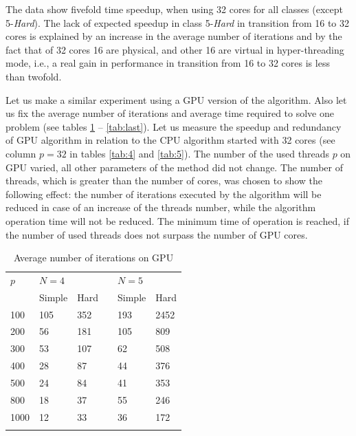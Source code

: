 \documentclass[smallcondensed]{svjour3}     %
\begin{document}
The data show fivefold time speedup, when using 32 cores for all classes (except 5-\textit{Hard}). The lack of expected speedup in class 5-\textit{Hard} in transition from 16 to 32 cores is explained by an increase in the average number of iterations and by the fact that of 32 cores 16 are physical, and other 16 are virtual in hyper-threading mode, i.e., a real gain in performance in transition from 16 to 32 cores is less than twofold.

Let us make a similar experiment using a GPU version of the algorithm. Also let us fix the average number of iterations and average time required to solve one problem (see tables \ref{tab:last4} -- \ref{tab:last}). Let us measure the speedup and redundancy of GPU algorithm in relation to the CPU algorithm started with 32 cores (see column $p=32$ in tables \ref{tab:4} and \ref{tab:5}). The number of the used threads $p$ on GPU varied, all other parameters of the method did not change. The number of threads, which is greater than the number of cores, was chosen to show the following effect: the number of iterations executed by the algorithm will be reduced in case of an increase of the threads number, while the algorithm operation time will not be reduced. The minimum time of operation is reached, if the number of used threads does not surpass the number of GPU cores.


\begin{table}
	\caption{Average number of iterations on GPU}
	\label{tab:last4}
	\center
	\begin{tabular}{llllll}
		\hline\noalign{\smallskip}
		$p$ & \multicolumn{2}{l}{ $N=4$ } & & \multicolumn{2}{l}{$N=5$} \\
		\noalign{\smallskip} \cline{2-3} \cline{5-6} \noalign{\smallskip}
		 & Simple & Hard & & Simple & Hard  \\
		\noalign{\smallskip} \hline \noalign{\smallskip}		
100 &	105 &	352 & &	193  &	2452 \\
200 &	56 &	181 & &	105  &	809 \\
300 &	53 &	107 & & 62  &	508 \\
400 &	28 &	87 & &	44  &	376 \\
500 &	24 &	84 & &	41  &	353 \\
800 &	18 &	37 & &	55 &	246 \\
1000 &	12 &	33 & &	36 &	172 \\
		\noalign{\smallskip}\hline
	\end{tabular}
\end{table}
\end{document}
